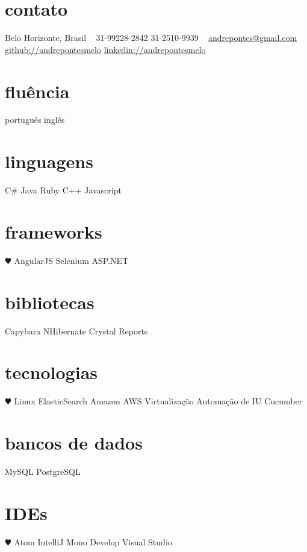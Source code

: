 \documentclass[]{friggeri-cv}
\begin{document}


\begin{aside}
\section{contato}
Belo Horizonte, Brasil
~
31-99228-2842
31-2510-9939
~
\href{mailto:andrepontes@gmail.com}{andrepontes@gmail.com}
\href{https://github.com/andrepontesmelo}{github://andrepontesmelo}
\href{https://br.linkedin.com/in/andrepontesmelo}{linkedin://andrepontesmelo}
\section{fluência}
português
inglês
\section{linguagens}
C\#
Java
Ruby
C++
Javascript
\section{frameworks}
 {\color{red} $\varheartsuit$} AngularJS
Selenium
ASP.NET
\section{bibliotecas}
Capybara
NHibernate
Crystal Reports
\section{tecnologias}
 {\color{red} $\varheartsuit$} Linux
ElasticSearch
Amazon AWS
Virtualização
Automação de IU
Cucumber
\section{bancos de dados}
MySQL
PostgreSQL
\section{IDEs}
{\color{red} $\varheartsuit$} Atom
IntelliJ
Mono Develop
Visual Studio
\end{aside}
\end{document}
